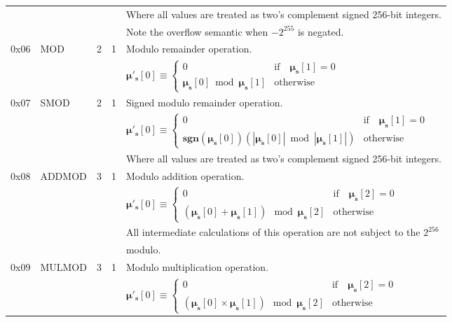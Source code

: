 \documentclass[9pt,oneside]{amsart}
\begin{document}
\begin{tabu}{r l r r l}
&&&& Where all values are treated as two's complement signed 256-bit integers. \\
&&&& Note the overflow semantic when $-2^{255}$ is negated.\\
\midrule
0x06 & {\small MOD} & 2 & 1 & Modulo remainder operation. \\
&&&& $\boldsymbol{\mu}'_{\mathbf{s}}[0] \equiv \begin{cases}0 & \text{if} \quad \boldsymbol{\mu}_{\mathbf{s}}[1] = 0\\ \boldsymbol{\mu}_{\mathbf{s}}[0] \bmod \boldsymbol{\mu}_{\mathbf{s}}[1] & \text{otherwise}\end{cases}$  \\
\midrule
0x07 & {\small SMOD} & 2 & 1 & Signed modulo remainder operation. \\
&&&& $\boldsymbol{\mu}'_{\mathbf{s}}[0] \equiv \begin{cases}0 & \text{if} \quad \boldsymbol{\mu}_{\mathbf{s}}[1] = 0\\ \mathbf{sgn} (\boldsymbol{\mu}_{\mathbf{s}}[0]) (|\boldsymbol{\mu}_{\mathbf{s}}[0]| \bmod |\boldsymbol{\mu}_{\mathbf{s}}[1]|) & \text{otherwise}\end{cases}$  \\
&&&& Where all values are treated as two's complement signed 256-bit integers. \\
\midrule
0x08 & {\small ADDMOD} & 3 & 1 & Modulo addition operation. \\
&&&& $\boldsymbol{\mu}'_{\mathbf{s}}[0] \equiv \begin{cases}0 & \text{if} \quad \boldsymbol{\mu}_{\mathbf{s}}[2] = 0\\ (\boldsymbol{\mu}_{\mathbf{s}}[0] + \boldsymbol{\mu}_{\mathbf{s}}[1]) \mod \boldsymbol{\mu}_{\mathbf{s}}[2] & \text{otherwise}\end{cases}$  \\
&&&& All intermediate calculations of this operation are not subject to the $2^{256}$ \\
&&&& modulo. \\
\midrule
0x09 & {\small MULMOD} & 3 & 1 & Modulo multiplication operation. \\
&&&& $\boldsymbol{\mu}'_{\mathbf{s}}[0] \equiv \begin{cases}0 & \text{if} \quad \boldsymbol{\mu}_{\mathbf{s}}[2] = 0\\ (\boldsymbol{\mu}_{\mathbf{s}}[0] \times \boldsymbol{\mu}_{\mathbf{s}}[1]) \mod \boldsymbol{\mu}_{\mathbf{s}}[2] & \text{otherwise}\end{cases}$  \\

\end{tabu}
\end{document}
